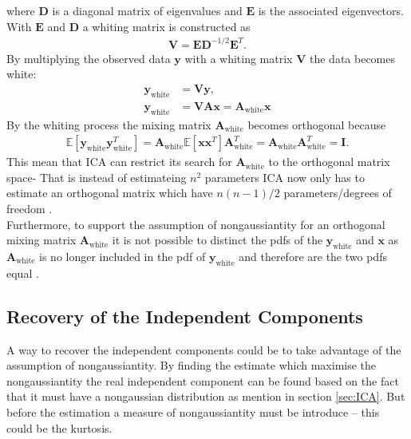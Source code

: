 where $\mathbf{D}$ is a diagonal matrix of eigenvalues and $\mathbf{E}$ is the associated eigenvectors. With $\mathbf{E}$ and $\mathbf{D}$ a whiting matrix is constructed as
\begin{align*}
\mathbf{V} = \mathbf{ED}^{-1/2} \mathbf{E}^T.
\end{align*}
By multiplying the observed data $\mathbf{y}$ with a whiting matrix $\mathbf{V}$ the data becomes white:
\begin{align}
\mathbf{y}_{\text{white}} &= \mathbf{Vy}, \\
\mathbf{y}_{\text{white}} &= \mathbf{VAx} = \mathbf{A}_{\text{white}} \mathbf{x} \nonumber
\end{align}
By the whiting process the mixing matrix $\mathbf{A}_{\text{white}}$ becomes orthogonal because
\begin{align*}
 \mathbb{E}[\mathbf{y}_{\text{white}} \mathbf{y}_{\text{white}}^T] = \mathbf{A}_{\text{white}} \mathbb{E}[\mathbf{xx}^T] \mathbf{A}_{\text{white}}^T = \mathbf{A}_{\text{white}} \mathbf{A}_{\text{white}}^T = \mathbf{I}.
 \end{align*} 
This mean that ICA can restrict its search for $\mathbf{A}_{\text{white}}$ to the orthogonal matrix space- That is instead of estimateing $n^2$ parameters ICA now only has to estimate an orthogonal matrix which have $n(n-1)/2$ parameters/degrees of freedom \cite[p. 159]{ICA}.
\\
Furthermore, to support the assumption of nongaussiantity for an orthogonal mixing matrix $\mathbf{A}_{\text{white}}$ it is not possible to distinct the pdfs of the $\mathbf{y}_{\text{white}}$ and $\mathbf{x}$ as $\mathbf{A}_{\text{white}}$ is no longer included in the pdf of $\mathbf{y}_{\text{white}}$ and therefore are the two pdfs equal \cite[p. 161-163]{ICA}.

\subsection{Recovery of the Independent Components}\label{sec:est_ica}
A way to recover the independent components could be to take advantage of the assumption of nongaussiantity. By finding the estimate which maximise the nongaussiantity the real independent component can be found based on the fact that it must have a nongaussian distribution as mention in section \ref{sec:ICA}. But before the estimation a measure of nongaussiantity must be introduce -- this could be the kurtosis.

